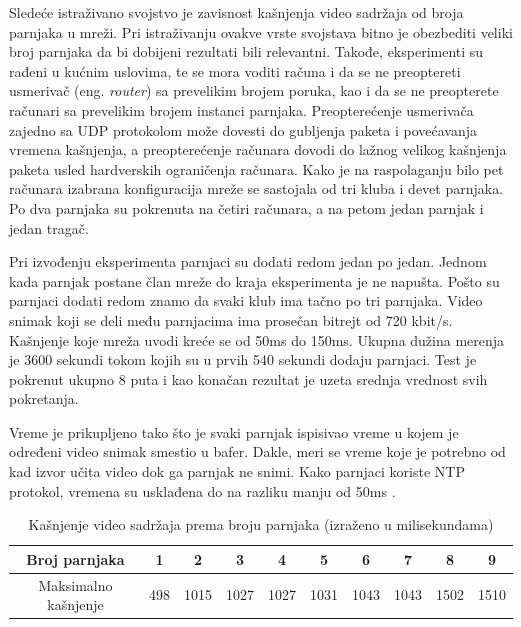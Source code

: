 \documentclass[12pt,oneside]{memoir}
\begin{document}
Sledeće istraživano svojstvo je zavisnost kašnjenja video sadržaja od broja parnjaka u mreži. Pri istraživanju ovakve vrste svojstava bitno je obezbediti veliki broj parnjaka da bi dobijeni rezultati bili relevantni. Takođe, eksperimenti su rađeni u kućnim uslovima, te se mora voditi računa i da se ne preoptereti usmerivač (eng. \textit{router}) sa prevelikim brojem poruka, kao i da se ne preopterete računari sa prevelikim brojem instanci parnjaka. Preopterećenje usmerivača zajedno sa UDP protokolom može dovesti do gubljenja paketa i povećavanja vremena kašnjenja, a preopterećenje računara dovodi do lažnog velikog kašnjenja paketa usled hardverskih ograničenja računara. Kako je na raspolaganju bilo pet računara izabrana konfiguracija mreže se sastojala od tri kluba i devet parnjaka. Po dva parnjaka su pokrenuta na četiri računara, a na petom jedan parnjak i jedan tragač.

Pri izvođenju eksperimenta parnjaci su dodati redom jedan po jedan. Jednom kada parnjak postane član mreže do kraja eksperimenta je ne napušta. Pošto su parnjaci dodati redom znamo da svaki klub ima tačno po tri parnjaka. Video snimak koji se deli među parnjacima ima prosečan bitrejt od 720 kbit/s. Kašnjenje koje mreža uvodi kreće se od 50ms do 150ms. Ukupna dužina merenja je 3600 sekundi tokom kojih su u prvih 540 sekundi dodaju parnjaci. Test je pokrenut ukupno 8 puta i kao konačan rezultat je uzeta srednja vrednost svih pokretanja. 

Vreme je prikupljeno tako što je svaki parnjak ispisivao vreme u kojem je određeni video snimak smestio u bafer. Dakle, meri se vreme koje je potrebno od kad izvor učita video dok ga parnjak ne snimi. Kako parnjaci koriste NTP protokol, vremena su usklađena do na razliku manju od 50ms \cite{Magee}. 


\begin{table}[h]
\caption{Kašnjenje video sadržaja prema broju parnjaka (izraženo u milisekundama)} 
\label{tab:kasnjenje}
\centering
\begin{tabular}{ |c|c|c|c|c|c|c|c|c|c| } 
\hline 
 Broj parnjaka & 1 & 2 & 3 & 4 & 5 & 6 & 7 & 8 & 9 \\
\hline
 Maksimalno kašnjenje & 498 & 1015 & 1027 & 1027 & 1031 & 1043 & 1043 & 1502 & 1510  \\
\hline
\end{tabular}
\end{table}
\end{document}
